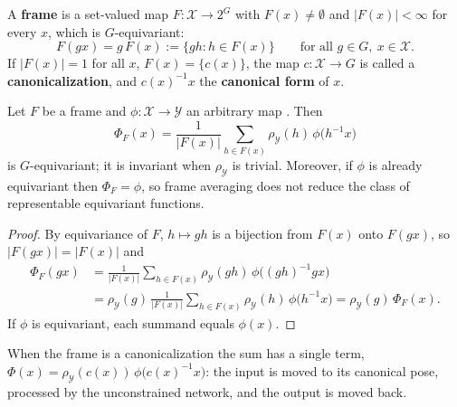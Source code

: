 \begin{definition}[Frame]\label{def:frame_equivariante}
A \textbf{frame} is a set-valued map $F: \mathcal{X} \to 2^G$ with $F(x) \neq \emptyset$ and $|F(x)| < \infty$ for every $x$, which is $G$-equivariant:
\[F(gx) = g\,F(x) := \{ gh : h \in F(x) \} \qquad \text{for all } g \in G,\ x \in \mathcal{X}.\]
If $|F(x)| = 1$ for all $x$, $F(x) = \{c(x)\}$, the map $c: \mathcal{X} \to G$ is called a \textbf{canonicalization}, and $c(x)^{-1}x$ the \textbf{canonical form} of $x$.
\end{definition}

\begin{theorem}\label{thm:frame_averaging}
Let $F$ be a frame and $\phi: \mathcal{X} \to \mathcal{Y}$ an arbitrary map \citep{puny2022frameaveraging}. Then
\[\Phi_F(x) = \frac{1}{|F(x)|} \sum_{h \in F(x)} \rho_{\mathcal{Y}}(h)\, \phi\big(h^{-1}x\big)\]
is $G$-equivariant; it is invariant when $\rho_{\mathcal{Y}}$ is trivial. Moreover, if $\phi$ is already equivariant then $\Phi_F = \phi$, so frame averaging does not reduce the class of representable equivariant functions.
\end{theorem}

\begin{proof}
By equivariance of $F$, $h \mapsto gh$ is a bijection from $F(x)$ onto $F(gx)$, so $|F(gx)| = |F(x)|$ and
\begin{align*}
\Phi_F(gx) &= \frac{1}{|F(x)|} \sum_{h \in F(x)} \rho_{\mathcal{Y}}(gh)\, \phi\big((gh)^{-1} gx\big) \\
&= \rho_{\mathcal{Y}}(g)\, \frac{1}{|F(x)|}\sum_{h \in F(x)} \rho_{\mathcal{Y}}(h)\, \phi\big(h^{-1}x\big) = \rho_{\mathcal{Y}}(g)\, \Phi_F(x).
\end{align*}
If $\phi$ is equivariant, each summand equals $\phi(x)$.
\end{proof}

When the frame is a canonicalization the sum has a single term, $\Phi(x) = \rho_{\mathcal{Y}}(c(x))\, \phi\big(c(x)^{-1}x\big)$: the input is moved to its canonical pose, processed by the unconstrained network, and the output is moved back.

